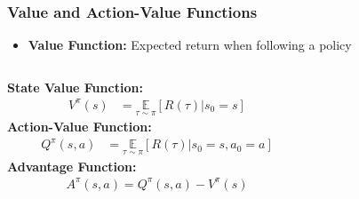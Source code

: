 \begin{frame}
    \frametitle{Value and Action-Value Functions}
    \begin{itemize}
        \item \textbf{Value Function:} Expected return when following a policy
    \end{itemize}
    \vspace{5pt}
    \setlength{\itemsep}{6pt}
    \begin{columns}[T]
        \begin{column}{0.55\textwidth}
            \textbf{State Value Function:}
            \begin{align*}
                V^{\pi}(s) &= \underset{\tau \sim \pi}{\mathbb{E}}\left[R(\tau)|s_0 = s\right]
            \end{align*}
            \vspace{0.3cm}
            \textbf{Action-Value Function:}
            \begin{align*}
                Q^{\pi}(s,a) &= \underset{\tau \sim \pi}{\mathbb{E}}\left[R(\tau)|s_0 = s, a_0 = a\right]
            \end{align*}
            \vspace{0.3cm}
            \textbf{Advantage Function:}
            \begin{align*}
                A^{\pi}(s,a) = Q^{\pi}(s,a) - V^{\pi}(s)
            \end{align*}
        \end{column}
        
        \begin{column}{0.35\textwidth}
            \vspace{-1.1cm}
            \begin{figure}
\end{figure}
\end{column}
\end{columns}
\end{frame}
